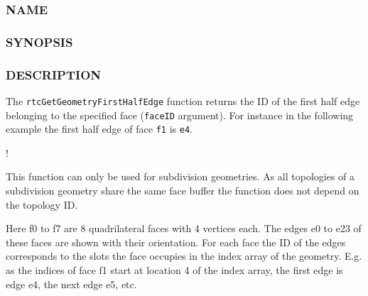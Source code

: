 \subsubsection{NAME}\label{name}

\begin{Shaded}
\begin{Highlighting}[]
\OperatorTok{{-}}
\end{Highlighting}
\end{Shaded}

\subsubsection{SYNOPSIS}\label{synopsis}

\begin{Shaded}
\begin{Highlighting}[]

 \OperatorTok{(}
\OperatorTok{,}
   
\OperatorTok{);}
\end{Highlighting}
\end{Shaded}

\subsubsection{DESCRIPTION}\label{description}

The \texttt{rtcGetGeometryFirstHalfEdge} function returns the ID of the
first half edge belonging to the specified face (\texttt{faceID}
argument). For instance in the following example the first half edge of
face \texttt{f1} is \texttt{e4}.

!\href{images/half_edges.pdf}{}

This function can only be used for subdivision geometries. As all
topologies of a subdivision geometry share the same face buffer the
function does not depend on the topology ID.

Here f0 to f7 are 8 quadrilateral faces with 4 vertices each. The edges
e0 to e23 of these faces are shown with their orientation. For each face
the ID of the edges corresponds to the slots the face occupies in the
index array of the geometry. E.g. as the indices of face f1 start at
location 4 of the index array, the first edge is edge e4, the next edge
e5, etc.

